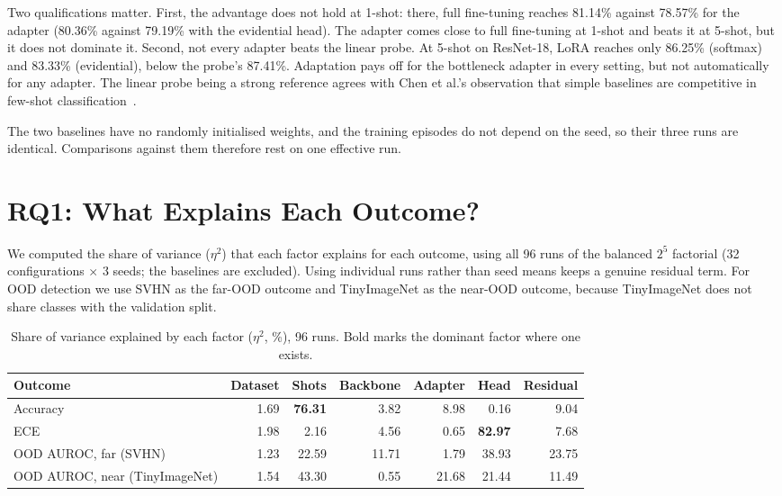 Two qualifications matter. First, the advantage does not hold at 1-shot: there, full fine-tuning
reaches 81.14\% against 78.57\% for the adapter (80.36\% against 79.19\% with the evidential head). The
adapter comes close to full fine-tuning at 1-shot and beats it at 5-shot, but it does not dominate it. Second,
not every adapter beats the linear probe. At 5-shot on ResNet-18, LoRA reaches only 86.25\% (softmax) and
83.33\% (evidential), below the probe's 87.41\%. Adaptation pays off for the bottleneck adapter in every
setting, but not automatically for any adapter. The linear probe being a strong reference agrees with
Chen et al.'s observation that simple baselines are competitive in few-shot
classification~\cite{chen2019closer}.

The two baselines have no randomly initialised weights, and the training episodes do not depend on the
seed, so their three runs are identical. Comparisons against them therefore rest on one effective run.

\section{RQ1: What Explains Each Outcome?}
\label{sec:rq1}

We computed the share of variance ($\eta^2$) that each factor explains for each outcome, using all 96
runs of the balanced $2^5$ factorial (32 configurations $\times$ 3 seeds; the baselines are excluded).
Using individual runs rather than seed means keeps a genuine residual term. For OOD detection we use
SVHN as the far-OOD outcome and TinyImageNet as the near-OOD outcome, because TinyImageNet does not share
classes with the validation split.

\begin{table}[H]
\centering
\caption{Share of variance explained by each factor ($\eta^2$, \%), 96 runs. Bold marks the dominant
factor where one exists.}
\label{tab:eta}
\begin{adjustbox}{max width=\textwidth}
\begin{tabular}{@{}lrrrrrr@{}}
\toprule
Outcome & Dataset & Shots & Backbone & Adapter & Head & Residual \\
\midrule
Accuracy & 1.69 & \textbf{76.31} & 3.82 & 8.98 & 0.16 & 9.04 \\
ECE & 1.98 & 2.16 & 4.56 & 0.65 & \textbf{82.97} & 7.68 \\
OOD AUROC, far (SVHN) & 1.23 & 22.59 & 11.71 & 1.79 & 38.93 & 23.75 \\
OOD AUROC, near (TinyImageNet) & 1.54 & 43.30 & 0.55 & 21.68 & 21.44 & 11.49 \\
\bottomrule
\end{tabular}
\end{adjustbox}
\end{table}

